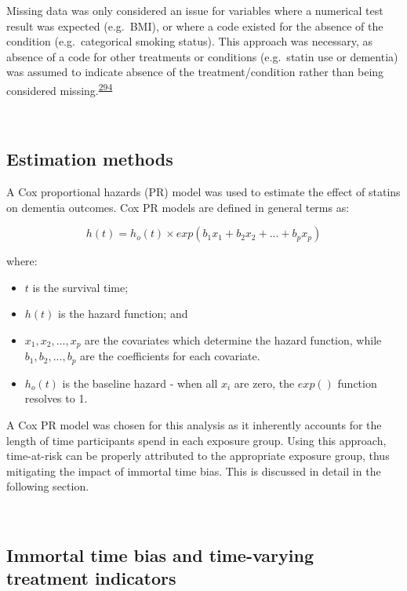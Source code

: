 \documentclass[a4paper, twoside]{templates/ociamthesis}
\providecommand{\tightlist}{%
  \setlength{\itemsep}{0pt}\setlength{\parskip}{0pt}}
\begin{document}
Missing data was only considered an issue for variables where a numerical test result was expected (e.g.~BMI), or where a code existed for the absence of the condition (e.g.~categorical smoking status). This approach was necessary, as absence of a code for other treatments or conditions (e.g.~statin use or dementia) was assumed to indicate absence of the treatment/condition rather than being considered missing.\textsuperscript{\protect\hyperlink{ref-wells2013strategies}{294}}

~

\hypertarget{estimation-methods}{%
\subsection{Estimation methods}\label{estimation-methods}}

A Cox proportional hazards (PR) model was used to estimate the effect of statins on dementia outcomes. Cox PR models are defined in general terms as:

\begin{equation}
  h(t) = h_o(t) \times exp(b_1x_1 + b_2x_2 + ... +b_px_p)
  \label{eq:cox-model}
\end{equation}

where:

\begin{itemize}
\tightlist
\item
  \(t\) is the survival time;
\item
  \(h(t)\) is the hazard function; and
\item
  \(x_1,x_2,...,x_p\) are the covariates which determine the hazard function, while \(b_1,b_2,...,b_p\) are the coefficients for each covariate.
\item
  \(h_o(t)\) is the baseline hazard - when all \(x_i\) are zero, the \(exp()\) function resolves to 1.
\end{itemize}

A Cox PR model was chosen for this analysis as it inherently accounts for the length of time participants spend in each exposure group. Using this approach, time-at-risk can be properly attributed to the appropriate exposure group, thus mitigating the impact of immortal time bias. This is discussed in detail in the following section.

~

\hypertarget{cprd-immortal-time-bias}{%
\subsection{Immortal time bias and time-varying treatment indicators}\label{cprd-immortal-time-bias}}
\end{document}
